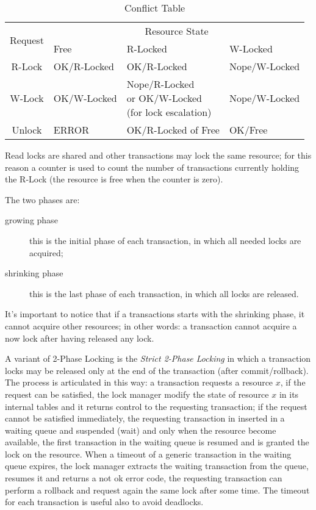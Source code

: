 \begin{table}[h]
	\centering
	\begin{tabular}{c|l|l|l}
		\multicolumn{1}{c|}{\multirow{2}{*}{Request}} & \multicolumn{3}{c}{Resource State} \\ \cline{2-4}
		& Free & R-Locked & W-Locked \\ \hline
		R-Lock & OK/R-Locked & OK/R-Locked & Nope/W-Locked \\ \hline
		W-Lock & OK/W-Locked & \parbox[l]{3cm}{Nope/R-Locked\\or OK/W-Locked\\(for lock escalation)} & Nope/W-Locked \\ \hline
		Unlock & ERROR & OK/R-Locked of Free & OK/Free \\
	\end{tabular}
	\caption{Conflict Table}
\end{table}
Read locks are shared and other transactions may lock the same resource; for this reason a counter is used to count the number of transactions currently holding the R-Lock (the resource is free when the counter is zero).

The two phases are:
\begin{description}
	\item[growing phase] this is the initial phase of each transaction, in which all needed locks are acquired;
	\item[shrinking phase] this is the last phase of each transaction, in which all locks are released.
\end{description}
It's important to notice that if a transactions starts with the shrinking phase, it cannot acquire other resources; in other words: a transaction cannot acquire a now lock after having released any lock.

A variant of 2-Phase Locking is the \emph{Strict 2-Phase Locking} in which a transaction locks may be released only at the end of the transaction (after commit/rollback).
The process is articulated in this way: a transaction requests a resource $x$, if the request can be satisfied, the lock manager modify the state of resource $x$ in its internal tables and it returns control to the requesting transaction; if the request cannot be satisfied immediately, the requesting transaction in inserted in a waiting queue and suspended (wait) and only when the resource become available, the first transaction in the waiting queue is resumed and is granted the lock on the resource.
When a timeout of a generic transaction in the waiting queue expires, the lock manager extracts the waiting transaction from the queue, resumes it and returns a not ok error code, the requesting transaction can perform a rollback and request again the same lock after some time.
The timeout for each transaction is useful also to avoid deadlocks.